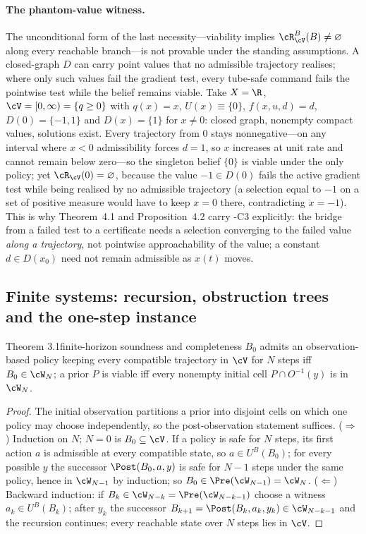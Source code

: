 \paragraph{The phantom-value witness.}\label{S:phantom}
The unconditional form of the last necessity---viability implies $\cR^B_\cV(B)\ne\varnothing$ along every reachable branch---is not provable under the standing assumptions. A closed-graph $D$ can carry point values that no admissible trajectory realises; where only such values fail the gradient test, every tube-safe command fails the pointwise test while the belief remains viable. Take $X=\R$, $\cV=[0,\infty)=\{q\ge0\}$ with $q(x)=x$, $U(x)\equiv\{0\}$, $f(x,u,d)=d$, $D(0)=\{-1,1\}$ and $D(x)=\{1\}$ for $x\ne0$: closed graph, nonempty compact values, solutions exist. Every trajectory from $0$ stays nonnegative---on any interval where $x<0$ admissibility forces $d=1$, so $x$ increases at unit rate and cannot remain below zero---so the singleton belief $\{0\}$ is viable under the only policy; yet $\cR_\cV(0)=\varnothing$, because the value $-1\in D(0)$ fails the active gradient test while being realised by no admissible trajectory (a selection equal to $-1$ on a set of positive measure would have to keep $x=0$ there, contradicting $\dot x=-1$). This is why Theorem~4.1 and Proposition~4.2 carry \hyp{C3} explicitly: the bridge from a failed test to a certificate needs a selection converging to the failed value \emph{along a trajectory}, not pointwise approachability of the value; a constant $d\in D(x_0)$ need not remain admissible as $x(t)$ moves.

\subsection{Finite systems: recursion, obstruction trees and the one-step instance}\label{S:trees}

\begin{restated}{Theorem 3.1}{finite-horizon soundness and completeness}
$B_0$ admits an observation-based policy keeping every compatible trajectory in $\cV$ for $N$ steps iff $B_0\in\cW_N$; a prior $P$ is viable iff every nonempty initial cell $P\cap O^{-1}(y)$ is in $\cW_N$.
\end{restated}

\begin{proof}
The initial observation partitions a prior into disjoint cells on which one policy may choose independently, so the post-observation statement suffices. ($\Rightarrow$) Induction on $N$; $N=0$ is $B_0\subseteq\cV$. If a policy is safe for $N$ steps, its first action $a$ is admissible at every compatible state, so $a\in U^B(B_0)$; for every possible $y$ the successor $\Post(B_0,a,y)$ is safe for $N-1$ steps under the same policy, hence in $\cW_{N-1}$ by induction; so $B_0\in\Pre(\cW_{N-1})=\cW_N$. ($\Leftarrow$) Backward induction: if $B_k\in\cW_{N-k}=\Pre(\cW_{N-k-1})$ choose a witness $a_k\in U^B(B_k)$; after $y_k$ the successor $B_{k+1}=\Post(B_k,a_k,y_k)\in\cW_{N-k-1}$ and the recursion continues; every reachable state over $N$ steps lies in $\cV$.
\end{proof}

